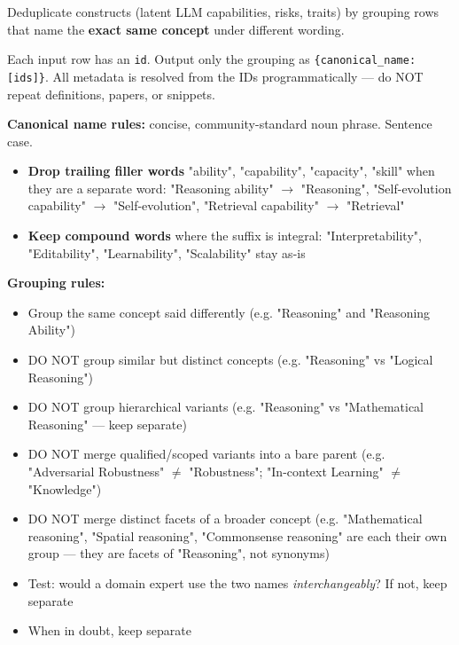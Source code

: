 \begin{tcolorbox}[breakable,enhanced,colback=blue!3,colframe=blue!40!black,title={Prompt},fonttitle=\bfseries,left=8pt,right=8pt,top=6pt,bottom=6pt]

Deduplicate constructs (latent LLM capabilities, risks, traits) by grouping rows that name the \textbf{exact same concept} under different wording.

Each input row has an \texttt{id}. Output only the grouping as \texttt{\{canonical\_name: [ids]\}}. All metadata is resolved from the IDs programmatically --- do NOT repeat definitions, papers, or snippets.

\textbf{Canonical name rules:} concise, community-standard noun phrase. Sentence case.
\begin{itemize}
\item \textbf{Drop trailing filler words} "ability", "capability", "capacity", "skill" when they are a separate word: "Reasoning ability" $\rightarrow$ "Reasoning", "Self-evolution capability" $\rightarrow$ "Self-evolution", "Retrieval capability" $\rightarrow$ "Retrieval"
\item \textbf{Keep compound words} where the suffix is integral: "Interpretability", "Editability", "Learnability", "Scalability" stay as-is
\end{itemize}

\textbf{Grouping rules:}
\begin{itemize}
\item Group the same concept said differently (e.g. "Reasoning" and "Reasoning Ability")
\item DO NOT group similar but distinct concepts (e.g. "Reasoning" vs "Logical Reasoning")
\item DO NOT group hierarchical variants (e.g. "Reasoning" vs "Mathematical Reasoning" --- keep separate)
\item DO NOT merge qualified/scoped variants into a bare parent (e.g. "Adversarial Robustness" $\neq$ "Robustness"; "In-context Learning" $\neq$ "Knowledge")
\item DO NOT merge distinct facets of a broader concept (e.g. "Mathematical reasoning", "Spatial reasoning", "Commonsense reasoning" are each their own group --- they are facets of "Reasoning", not synonyms)
\item Test: would a domain expert use the two names \textit{interchangeably}? If not, keep separate
\item When in doubt, keep separate
\end{itemize}


\end{tcolorbox}

